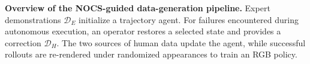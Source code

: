\textbf{Overview of the NOCS-guided data-generation pipeline.}
Expert demonstrations $\mathcal D_E$ initialize a trajectory agent. For
failures encountered during autonomous execution, an operator restores a
selected state and provides a correction $\mathcal D_H$. The two sources of
human data update the agent, while successful rollouts are re-rendered under
randomized appearances to train an RGB policy.
